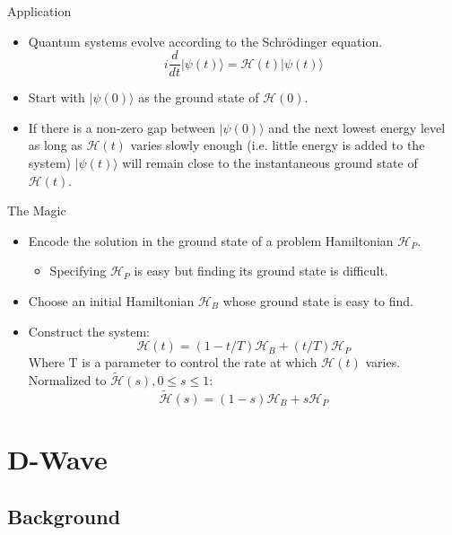 \documentclass{beamer}
\begin{document}
\begin{frame}{Application}

  \begin{itemize}
    \item Quantum systems evolve according to the Schr\"{o}dinger equation.
     \[ i \frac{d}{dt} |\psi(t)\rangle = \mathcal{H}(t)|\psi(t)\rangle\]
    \pause
   \item Start with \(|\psi(0)\rangle\) as the ground state of \(\mathcal{H}(0)\).
    \pause
   \item If there is a non-zero gap between \(|\psi(0)\rangle\) and the next lowest energy level as long as \(\mathcal{H}(t)\) varies slowly enough (i.e. little energy is added to the system) \(|\psi(t)\rangle\) will remain close to the instantaneous ground state of \(\mathcal{H}(t)\).
  \end{itemize}

\end{frame}

\begin{frame}{The Magic}
\pause
  \begin{itemize}
   \item Encode the solution in the ground state of a problem Hamiltonian \(\mathcal{H}_P\).
    \begin{itemize}
     \item Specifying \(\mathcal{H}_P\) is easy but finding its ground state is difficult.
    \end{itemize}
    \pause
   \item Choose an initial Hamiltonian \(\mathcal{H}_B\) whose ground state is easy to find.
    \pause
   \item Construct the system: \[\mathcal{H}(t) = (1-t/T)\mathcal{H}_B + (t/T)\mathcal{H}_P\] Where T is a parameter to control the rate at which \(\mathcal{H}(t)\) varies.  Normalized to \(\tilde{\mathcal{H}}(s), 0 \leq s\leq 1\): \[\tilde{\mathcal{H}}(s) = (1-s)\mathcal{H}_B + s\mathcal{H}_P\]

  \end{itemize}

\end{frame}

\section{D-Wave}

\subsection{Background}
\end{document}
